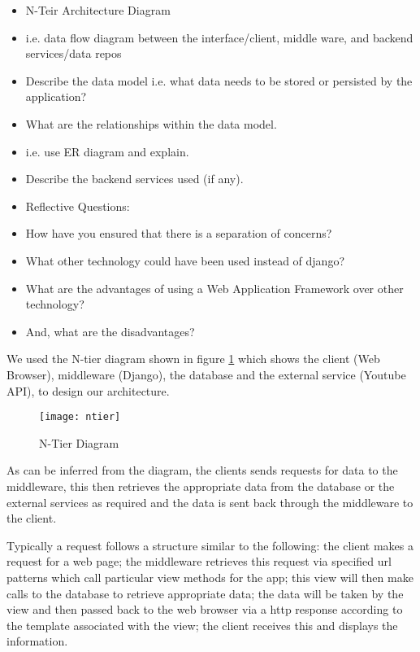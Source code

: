 \begin{itemize}
\item	N-Teir Architecture Diagram
\item	i.e. data flow diagram between the interface/client, middle ware, and backend services/data repos
\item	Describe the data model i.e. what data needs to be stored or persisted by the application?
\item	What are the relationships within the data model.
\item	i.e. use ER diagram and explain.
\item	Describe the backend services used (if any).
\item	Reflective Questions: 
\item	How have you ensured that there is a separation of concerns? 
\item	What other technology could have been used instead of django? 
\item	What are the advantages of using a Web Application Framework over other technology? 
\item	And, what are the disadvantages?
\end{itemize}


We used the N-tier diagram shown in figure \ref{fig:n-tier} which
shows the client (Web Browser), middleware (Django), the database and
the external service (Youtube API), to design our architecture.

\begin{figure}[h]
  \begin{center}
    \texttt{[image: ntier]}
    \caption{N-Tier Diagram} \label{fig:n-tier}
  \end{center}
\end{figure}

As can be inferred from the diagram, the clients sends requests for
data to the middleware, this then retrieves the appropriate data from
the database or the external services as required and the data is sent
back through the middleware to the client.

Typically a request follows a structure similar to the following:
the client makes a request for a web page; the middleware retrieves
this request via specified url patterns which call particular view
methods for the app; this view will then make calls to the database to
retrieve appropriate data; the data will be taken by the view and then
passed back to the web browser via a http response according to the
template associated with the view; the client receives this and
displays the information.

